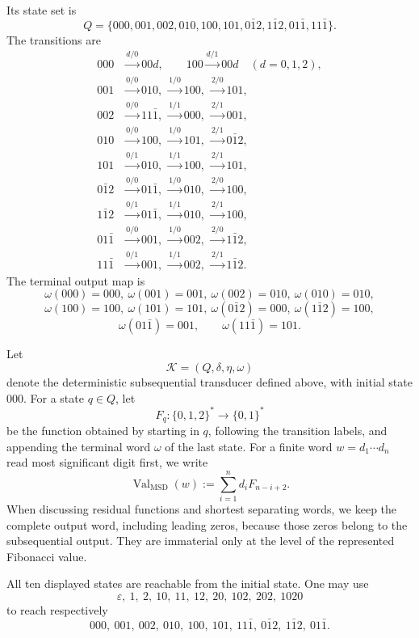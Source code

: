 \documentclass[11pt,letterpaper]{article}
\numberwithin{equation}{section}
\theoremstyle{plain}
\theoremstyle{definition}
\theoremstyle{remark}
\DeclareMathOperator{\Val}{Val}
\begin{document}
Its state set is
\[
Q=
\{000,001,002,010,100,101,0\bar{1}2,1\bar{1}2,01\bar{1},11\bar{1}\}.
\]
The transitions are
\[
\begin{aligned}
000&\xrightarrow{d/0}00d,\qquad 100\xrightarrow{d/1}00d\quad(d=0,1,2),\\
001&\xrightarrow{0/0}010,\ \xrightarrow{1/0}100,\ \xrightarrow{2/0}101,\\
002&\xrightarrow{0/0}11\bar{1},\ \xrightarrow{1/1}000,\ \xrightarrow{2/1}001,\\
010&\xrightarrow{0/0}100,\ \xrightarrow{1/0}101,\ \xrightarrow{2/1}0\bar{1}2,\\
101&\xrightarrow{0/1}010,\ \xrightarrow{1/1}100,\ \xrightarrow{2/1}101,\\
0\bar{1}2&\xrightarrow{0/0}01\bar{1},\ \xrightarrow{1/0}010,\ \xrightarrow{2/0}100,\\
1\bar{1}2&\xrightarrow{0/1}01\bar{1},\ \xrightarrow{1/1}010,\ \xrightarrow{2/1}100,\\
01\bar{1}&\xrightarrow{0/0}001,\ \xrightarrow{1/0}002,\ \xrightarrow{2/0}1\bar{1}2,\\
11\bar{1}&\xrightarrow{0/1}001,\ \xrightarrow{1/1}002,\ \xrightarrow{2/1}1\bar{1}2.
\end{aligned}
\]
The terminal output map is
\[
\omega(000)=000,\ \omega(001)=001,\ \omega(002)=010,\ \omega(010)=010,
\]
\[
\omega(100)=100,\ \omega(101)=101,\ \omega(0\bar{1}2)=000,\ \omega(1\bar{1}2)=100,
\]
\[
\omega(01\bar{1})=001,\qquad \omega(11\bar{1})=101.
\]

Let
\[
\mathcal K=(Q,\delta,\eta,\omega)
\]
denote the deterministic subsequential transducer defined above, with initial
state $000$.  For a state $q\in Q$, let
\[
F_q:\{0,1,2\}^\ast\to\{0,1\}^\ast
\]
be the function obtained by starting in $q$, following the transition labels,
and appending the terminal word $\omega$ of the last state.
For a finite word $w=d_1\cdots d_n$ read most significant digit first, we
write
\[
\Val_{\mathrm{MSD}}(w):=\sum_{i=1}^{n} d_i F_{n-i+2}.
\]
When discussing residual functions and shortest separating words, we keep the
complete output word, including leading zeros, because those zeros belong to
the subsequential output.  They are immaterial only at the level of the
represented Fibonacci value.

All ten displayed states are reachable from the initial state.  One may use
\[
\varepsilon,\ 1,\ 2,\ 10,\ 11,\ 12,\ 20,\ 102,\ 202,\ 1020
\]
to reach respectively
\[
000,\ 001,\ 002,\ 010,\ 100,\ 101,\ 11\bar{1},\ 0\bar{1}2,\ 1\bar{1}2,\ 01\bar{1}.
\]
\end{document}
